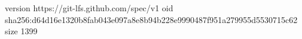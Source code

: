 version https://git-lfs.github.com/spec/v1
oid sha256:d64d16e1320b8fab043e097a8e8b94b228e9990487f951a279955d5530715c62
size 1399
